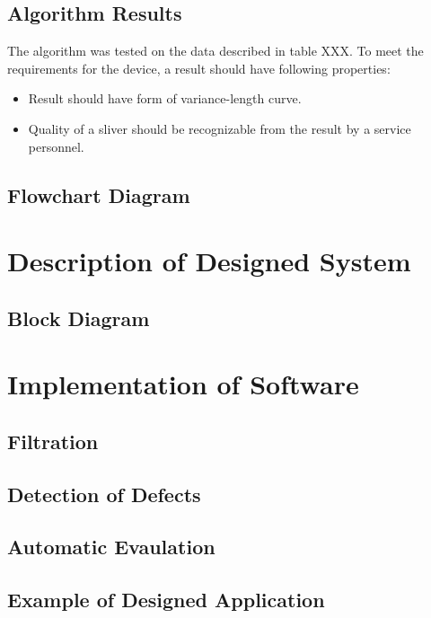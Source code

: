 \documentclass[twoside]{ctuthesis}
\theoremstyle{plain}
\theoremstyle{definition}
\theoremstyle{note}
\begin{document}
\subsection{Algorithm Results}
The algorithm was tested on the data described in table XXX. To meet the requirements for the device, a result should have following properties:
\begin{itemize}
	\setlength{\itemsep}{5pt}
	\item Result should have form of variance-length curve.
	\item Quality of a sliver should be recognizable from the result by a service personnel.
\end{itemize}

\subsection{Flowchart Diagram}
\section{Description of Designed System}
\subsection{Block Diagram}
\section{Implementation of Software}
\subsection{Filtration}
\subsection{Detection of Defects}
\subsection{Automatic Evaulation}
\subsection{Example of Designed Application}
\end{document}
